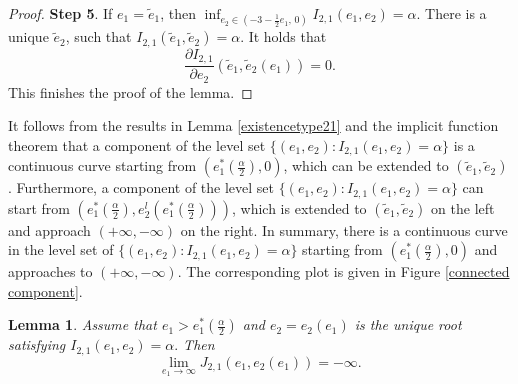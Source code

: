 \documentclass[reqno,12pt]{amsart}
\newtheorem{lemma}[theorem]{Lemma}
\begin{document}
{\begin{proof}
       \textbf{Step 5}. If $e_1  =\tilde{e}_1$, then $\inf_{e_2\in(-3-\frac{1}{2}e_1,\, 0)}I_{2,1}(e_1,e_2)=\alpha$. There is a unique $\tilde{e}_2$, such that $I_{2,1}(\tilde{e}_1, \tilde{e}_2)=\alpha$. It holds that 
       \begin{equation*}
            \frac{\partial I_{2, 1} }{\partial e_2}(\tilde{e}_1, \tilde{e}_2(e_1)) =0.
       \end{equation*}
This finishes the proof of the lemma.       
\end{proof}


It follows from the results in Lemma \ref{existencetype21} and the implicit function theorem that  a component of the
  level set  $\{(e_1,e_2): I_{2,1}(e_1,e_2)=\alpha\}$ is a continuous curve starting from $(e_1^*(\frac{\alpha}{2}),0)$, which can be extended to $(\tilde{e}_1,\tilde{e}_2)$.  Furthermore, a component of the
  level set  $\{(e_1,e_2): I_{2,1}(e_1,e_2)=\alpha\}$ can start from $(e_1^*(\frac{\alpha}{2}),e_2^l(e_1^*(\frac{\alpha}{2})))$, which is extended to $(\tilde{e}_1,\tilde{e}_2)$ on the left and approach  $(+\infty,-\infty)$ on the right. In summary,   there is a continuous curve in the level set of $\{(e_1,e_2): I_{2,1}(e_1,e_2)=\alpha\}$ starting from $(e_1^*(\frac{\alpha}{2}),0)$ and approaches to $(+\infty,-\infty)$. The corresponding plot is given in Figure \ref{connected component}.


\begin{lemma}\label{Lemmatype21-2}
Assume that $e_1 > e_1^* (\frac{\alpha}{2})$ and $e_2=e_2(e_1)$ is the unique root satisfying $I_{2, 1}(e_1, e_2) = \alpha. $ Then 
\begin{equation} \nonumber
    \lim_{e_1\rightarrow \infty} J_{2, 1}(e_1, e_2(e_1)) = -\infty. 
\end{equation}
\end{lemma}

}
\end{document}
